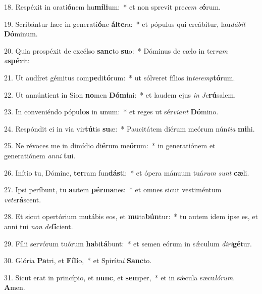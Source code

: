 18. Respéxit in orati\textbf{ó}nem hu\textbf{mí}\textbf{li}um:~*  et non sprevit pre\textit{cem} \textit{e}\textbf{ó}rum.\

19. Scribántur hæc in generati\textbf{ó}ne \textbf{ál}\textbf{te}ra:~*  et pópulus qui creábitur, lau\textit{dá}\textit{bit} \textbf{Dó}minum.\

20. Quia prospéxit de excélso \textbf{sanc}to \textbf{su}o:~*  Dóminus de cælo in ter\textit{ram} \textit{a}\textbf{spé}xit:\

21. Ut audíret gémitus com\textbf{pe}di\textbf{tó}rum:~*  ut sólveret fílios in\textit{ter}\textit{emp}\textbf{tó}rum.\

22. Ut annúntient in Sion \textbf{no}men \textbf{Dó}\textbf{mi}ni:~*  et laudem ejus \textit{in} \textit{Je}\textbf{rú}salem.\

23. In conveniéndo pópu\textbf{los} in \textbf{u}num:~*  et reges ut sér\textit{vi}\textit{ant} \textbf{Dó}mino.\

24. Respóndit ei in via vir\textbf{tú}tis \textbf{su}æ:~*  Paucitátem diérum meórum nún\textit{ti}\textit{a} \textbf{mi}hi.\

25. Ne révoces me in dimídio di\textbf{é}rum me\textbf{ó}rum:~*  in generatiónem et generatiónem \textit{an}\textit{ni} \textbf{tu}i.\

26. Inítio tu, Dómine, \textbf{ter}ram fun\textbf{dás}ti:~*  et ópera mánuum tuá\textit{rum} \textit{sunt} \textbf{cæ}li.\

27. Ipsi períbunt, tu \textbf{au}tem \textbf{pér}\textbf{ma}nes:~*  et omnes sicut vestiméntum \textit{ve}\textit{te}\textbf{rá}scent.\

28. Et sicut opertórium mutábis eos, et \textbf{mu}ta\textbf{bún}tur:~*  tu autem idem ipse es, et anni tui \textit{non} \textit{de}\textbf{fí}cient.\

29. Fílii servórum tuórum \textbf{ha}bi\textbf{tá}bunt:~*  et semen eórum in sǽculum \textit{di}\textit{ri}\textbf{gé}tur.\

30. Glória \textbf{Pa}tri, et \textbf{Fí}\textbf{li}o,~*  et Spirí\textit{tu}\textit{i} \textbf{Sanc}to.\

31. Sicut erat in princípio, et \textbf{nunc}, et \textbf{sem}per,~*  et in sǽcula sæcu\textit{ló}\textit{rum}. \textbf{A}men.\

